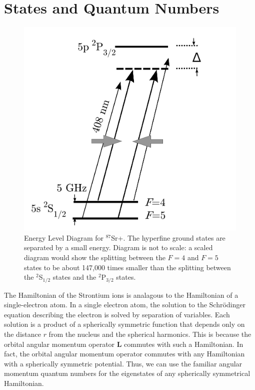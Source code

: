 
\section{States and Quantum Numbers}

\begin{figure}
\centerline{
\includegraphics[totalheight=0.3\textheight]{E_level_from_proposal}
}
\caption[Energy Level Diagram for $^{87}$Sr+]{Energy Level Diagram for $^{87}$Sr+. The hyperfine ground states are separated by a small energy. Diagram is not to scale: a scaled diagram would show the splitting between the $F=4$ and $F=5$ states to be about 147,000 times smaller than the splitting between the $^2$S$_{1/2}$ states and the $^2$P$_{3/2}$ states.}
\end{figure}

The Hamiltonian of the Strontium ions is analagous to the Hamiltonian of a single-electron atom. 
In a single electron atom, the solution to the Schr\"odinger equation describing the electron is solved by separation of variables.
 Each solution is a product of a spherically symmetric function that depends only on the distance $r$ from the nucleus and the spherical harmonics.
This is because the orbital angular momentum operator $\mathbf{L}$ commutes with such a Hamiltonian. In fact, the orbital angular momentum operator commutes with any Hamiltonian with a spherically symmetric potential.
Thus, we can use the familiar angular momentum quantum numbers for the eigenstates of any spherically symmetrical Hamiltonian.


